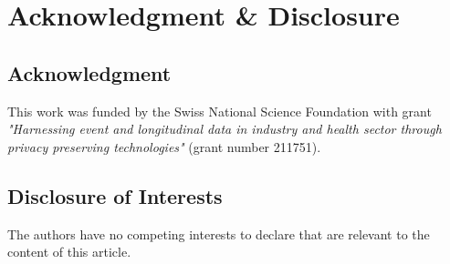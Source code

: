 \documentclass{article}
\begin{document}
\section*{Acknowledgment \& Disclosure} 
\subsection*{Acknowledgment} 
This work was funded by the Swiss National Science Foundation with grant \textit{"Harnessing event and longitudinal data in industry and health sector through privacy preserving technologies"} (grant number 211751).

\subsection*{Disclosure of Interests} 
The authors have no competing interests to declare that are relevant to the content of this article. 




\end{document}

